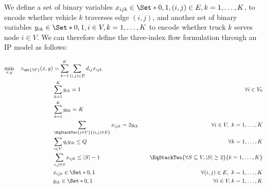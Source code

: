 We define a set of binary variables $x_{ijk} \in \Set*{0, 1}, (i, j) \in E, k = 1, \dots, K$, to encode whether vehicle $k$ traverses edge $(i, j)$,
and another set of binary variables $y_{ik} \in \Set*{0, 1}, i \in V, k = 1, \dots, K$ to encode whether truck $k$ serves node $i \in V$.
We can therefore define the three-index flow formulation through an IP model as follows:

\begin{align}
	\min_{x, y} \quad z_\mt{3F}(x, y) & =  \sum_{k = 1}^K \sum_{(i, j) \in E} d_{ij} x_{ijk} \label{eq:three-index-flow-obj-func}                                                                                                                          \\
	                                  & \sum_{k = 1}^K y_{ik} = 1                                                                 & \quad \forall i \in V_0                                              \label{eq:three-index-flow-all-customers-visited} \\
	                                  & \sum_{k = 1}^K y_{0k} = K                                                                 & \label{eq:three-index-flow-tour-starts-and-ends-at-depot}                                                              \\
	                                  & \sum_{\EqStackTwo{j \in V}{(i, j) \in E}} x_{ijk} = 2 y_{ik}                              & \quad \forall i \in V,\ k = 1, \dots, K \label{eq:three-index-flow-force-visited-customer-if-flow}                     \\
	                                  & \sum_{i \in V} q_i y_{ik} \le Q                                                           & \quad \forall k = 1, \dots, K \label{eq:three-index-flow-force-resource-upper-bound}                                   \\
	                                  & \sum_{i, j \in S} x_{ijk} \le |S| - 1                                                     & \quad \EqStackTwo{\forall S \subseteq V, |S| \ge 2}{k = 1, \dots, K} \label{eq:three-index-flow-secs}                  \\
	                                  & x_{ijk}                   \in \Set*{0, 1}                                                 & \quad \forall (i, j) \in E,\ k = 1, \dots, K             \label{eq:three-index-flow-x-mip-var-bounds}                  \\
	                                  & y_{ik}                    \in \Set*{0, 1}                                                 & \quad \forall i \in V,k = 1, \dots, K  \label{eq:three-index-flow-y-mip-var-bounds}
\end{align}

